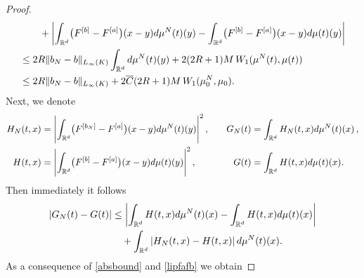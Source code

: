 \begin{proof}
\begin{align}
			&\qquad +\biggl|\int_{\mathbb{R}^d}\bigl(F^{[b]}-F^{[a]}\bigr)(x-y)d\mu^{N}(t)(y)
					-\int_{\mathbb{R}^d}\bigl(F^{[b]}-F^{[a]}\bigr)(x-y)d\mu(t)(y)\biggr|\\ \nonumber
			&\leq 2R \| b_{N}-b\|_{L_\infty(K)}\int_{\mathbb{R}^d}d\mu^{N}(t)(y)+ 2(2R+1)M\,W_1(\mu^N(t),\mu(t))\\ \nonumber
			&\leq 2R \| b_{N}-b\|_{L_\infty(K)}+2 \overline{C}(2R+1)M\,W_1(\mu_0^N,\mu_0). 
	\end{align}
	Next, we denote
	\begin{align*}
		H_N(t,x)&=\Biggl|\int_{\mathbb{R}^d}\bigl(F^{[b_{N}]}-F^{[a]}\bigr)(x-y)d\mu^{N}(t)(y)\Biggr|^2\,,\quad
		&G_N(t)&= \int_{\mathbb{R}^d}H_N(t,x)d\mu^N(t)(x)\,,\\
		H(t,x)&= \Biggl|\int_{\mathbb{R}^d}\bigl(F^{[b]}-F^{[a]}\bigr)(x-y)d\mu(t)(y)\Biggr|^2\,,
		&G(t)&= \int_{\mathbb{R}^d}H(t,x)d\mu(t)(x).
	\end{align*}
	Then immediately it follows
	\begin{align}
		|G_N(t)-G(t)|&\leq \left|\int_{\mathbb{R}^d}H(t,x)d\mu^N(t)(x) - \int_{\mathbb{R}^d}H(t,x)d\mu(t)(x)\right| \nonumber\\
		&\quad + \int_{\mathbb{R}^d}\left|H_N(t,x) - H(t,x)\right|d\mu^N(t)(x). \label{aux3}
	\end{align}
	As a consequence of \eqref{absbound} and \eqref{lipfafb} we obtain
	

\end{proof}
